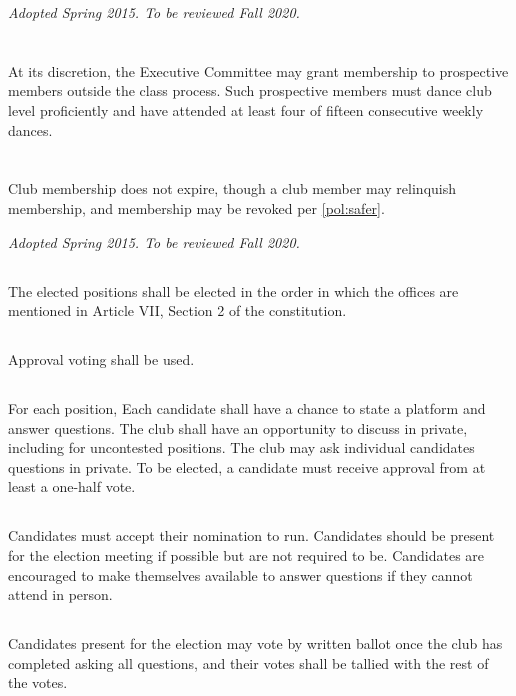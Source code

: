 \documentclass{bylaws}
\newcommand{\sptimes}[2]{\emph{Adopted #1. To be reviewed #2.}}
\begin{document}
\sptimes{Spring 2015}{Fall 2020}

\section{}At its discretion, the Executive Committee may grant membership to prospective members outside the class process. Such prospective members must dance club level proficiently and have attended at least four of fifteen consecutive weekly dances.
\section{}Club membership does not expire, though a club member may relinquish membership, and membership may be revoked per \ref{pol:safer}.


\label{pol:electappoint}
\sptimes{Spring 2015}{Fall 2020}

\label{pol:elect}

\subsection{}The elected positions shall be elected in the order in which the offices are mentioned in Article VII, Section 2 of the constitution. 
\subsection{}Approval voting shall be used. 
\subsection{}For each position,
\duty Each candidate shall have a chance to state a platform and answer questions.
\duty The club shall have an opportunity to discuss in private, including for uncontested positions.
\duty The club may ask individual candidates questions in private.
\duty To be elected, a candidate must receive approval from at least a one-half vote.  
\subsection{}Candidates must accept their nomination to run. Candidates should be present for the election meeting if possible but are not required to be. Candidates are encouraged to make themselves available to answer questions if they cannot attend in person.
\subsection{}Candidates present for the election may vote by written ballot once the club has completed asking all questions, and their votes shall be tallied with the rest of the votes.
\end{document}
